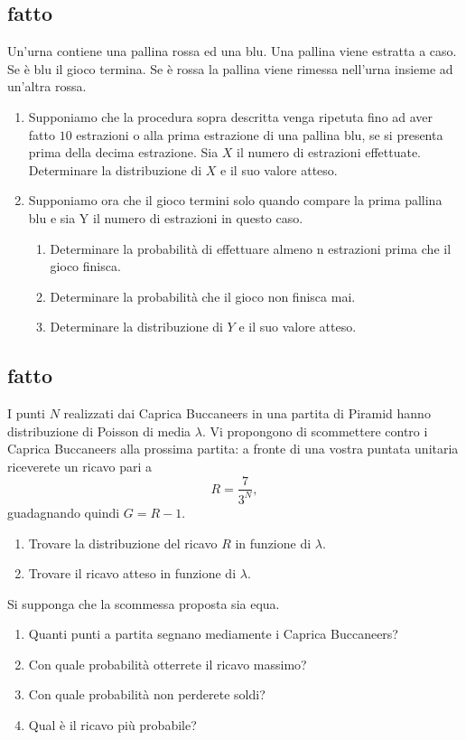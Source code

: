 \subsection{fatto}

Un'urna contiene una pallina rossa ed una blu. Una pallina viene estratta a caso. Se è blu il gioco termina. Se è rossa la pallina viene rimessa nell'urna insieme ad un'altra rossa.
\begin{enumerate}
\item Supponiamo che la procedura sopra descritta venga ripetuta fino ad aver fatto $10$ estrazioni o alla prima estrazione di una pallina blu, se si presenta prima della decima estrazione. Sia $X$ il numero di estrazioni effettuate. Determinare la distribuzione di $X$ e il suo valore atteso.
\item Supponiamo ora che il gioco termini solo quando compare la prima pallina blu e sia Y il numero di estrazioni in questo caso.
\begin{enumerate}
\item Determinare la probabilità di effettuare almeno n estrazioni prima che il gioco finisca.
\item Determinare la probabilità che il gioco non finisca mai.
\item Determinare la distribuzione di $Y$ e il suo valore atteso.
\end{enumerate}
\end{enumerate}
\subsection{fatto}

I punti $N$ realizzati dai Caprica Buccaneers in una partita di Piramid hanno distribuzione di Poisson di media $\lambda $. Vi propongono di scommettere contro i Caprica Buccaneers alla prossima partita: a fronte di una vostra puntata unitaria riceverete un ricavo pari a
\begin{equation*}
R=\frac{7}{3^{N}} ,
\end{equation*}
guadagnando quindi $G=R-1$.
\begin{enumerate}
\item Trovare la distribuzione del ricavo $R$ in funzione di $\lambda $.
\item Trovare il ricavo atteso in funzione di $\lambda $.
\end{enumerate}

Si supponga che la scommessa proposta sia equa.
\begin{enumerate}
\item Quanti punti a partita segnano mediamente i Caprica Buccaneers?
\item Con quale probabilità otterrete il ricavo massimo?
\item Con quale probabilità non perderete soldi?
\item Qual è il ricavo più probabile?
\end{enumerate}







